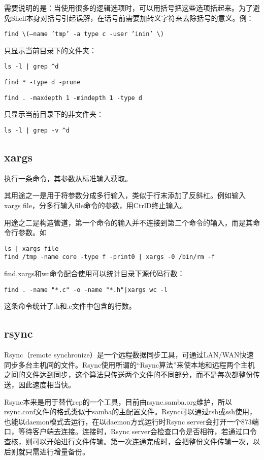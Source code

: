 需要说明的是：当使用很多的逻辑选项时，可以用括号把这些选项括起来。为了避免Shell本身对括号引起误解，在话号前需要加转义字符来去除括号的意义。例：

\verb+find \(–name ’tmp’ -a type c -user ’inin’ \)+


只显示当前目录下的文件夹：

\verb+ls -l | grep ^d+

\verb+find * -type d -prune+

\verb+find . -maxdepth 1 -mindepth 1 -type d+

只显示当前目录下的非文件夹：

\verb+ls -l | grep -v ^d+




\subsection{xargs}
执行一条命令，其参数从标准输入获取。

其用途之一是用于将参数分成多行输入，类似于行末添加了反斜杠。例如输入xargs file，分多行输入file命令的参数，用CtrlD终止输入。

用途之二是构造管道，第一个命令的输入并不连接到第二个命令的输入，而是其命令行参数。如

\begin{verbatim}
ls | xargs file
find /tmp -name core -type f -print0 | xargs -0 /bin/rm -f
\end{verbatim}

find,xargs和wc命令配合使用可以统计目录下源代码行数：
\begin{verbatim}
find . -name "*.c" -o -name "*.h"|xargs wc -l
\end{verbatim}
这条命令统计了.h和.c文件中包含的行数。


\subsection{rsync}
Rsync（remote synchronize）是一个远程数据同步工具，可通过LAN/WAN快速同步多台主机间的文件。Rsync使用所谓的“Rsync算法”来使本地和远程两个主机之间的文件达到同步，这个算法只传送两个文件的不同部分，而不是每次都整份传送，因此速度相当快。

Rsync本来是用于替代rcp的一个工具，目前由rsync.samba.org维护，所以rsync.conf文件的格式类似于samba的主配置文件。Rsync可以通过rsh或ssh使用，也能以daemon模式去运行，在以daemon方式运行时Rsync server会打开一个873端口，等待客户端去连接。连接时，Rsync server会检查口令是否相符，若通过口令查核，则可以开始进行文件传输。第一次连通完成时，会把整份文件传输一次，以后则就只需进行增量备份。


